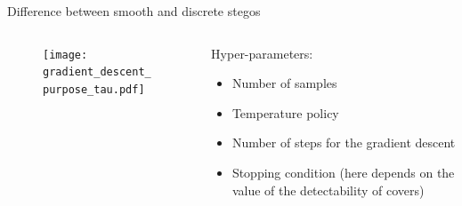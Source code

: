 \documentclass[10pt,aspectratio=169]{beamer}
\begin{document}
\begin{frame}{Difference between smooth and discrete stegos}

    \begin{columns}[c] 
        \begin{column}{.65\textwidth}
            \begin{figure}[h]
                \texttt{[image: gradient\_descent\_purpose\_tau.pdf]}
            \end{figure}
        \end{column}  
        
        \pause
        \begin{column}{.3\textwidth}
            Hyper-parameters:
                \begin{itemize}
                    \item Number of samples
                    \item Temperature policy
                    \item Number of steps for the gradient descent
                    \item Stopping condition (here depends on the value of the detectability of covers)
                \end{itemize}
        \end{column}  
    \end{columns}

\end{frame}


\end{document}
